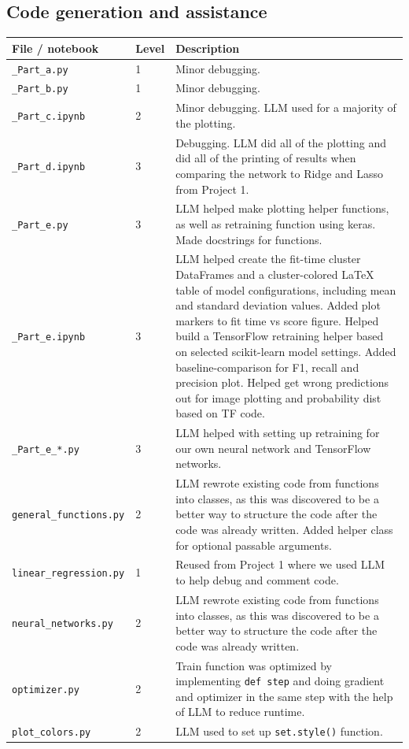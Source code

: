 \documentclass[reprint,english,notitlepage, floatfix]{revtex4-2}  %
\begin{document}
\subsection{Code generation and assistance}
\noindent
\begin{tabularx}{\linewidth}{l l X}
File / notebook & Level & Description\\ \hline
\texttt{\_Part\_a.py} & 1 & Minor debugging. \\
\texttt{\_Part\_b.py} & 1 & Minor debugging. \\
\texttt{\_Part\_c.ipynb} & 2 & Minor debugging. LLM used for a majority of the plotting. \\
\texttt{\_Part\_d.ipynb} & 3 & Debugging. LLM did all of the plotting and did all of the printing of results when comparing the network to Ridge and Lasso from Project 1. \\
\texttt{\_Part\_e.py} & 3 & LLM helped make plotting helper functions, as well as retraining function using keras. Made docstrings for functions.\\
\texttt{\_Part\_e.ipynb} & 3 & LLM helped create the fit-time cluster DataFrames and a cluster-colored LaTeX table of model configurations, including mean and standard deviation values. Added plot markers to fit time vs score figure. Helped build a TensorFlow retraining helper based on selected scikit-learn model settings. Added baseline-comparison for F1, recall and precision plot. Helped get wrong predictions out for image plotting and probability dist based on TF code. \\
\texttt{\_Part\_e\_*.py} & 3 & LLM helped with setting up retraining for our own neural network and TensorFlow networks. \\ 
\texttt{general\_functions.py} & 2 & LLM rewrote existing code from functions into classes, as this was discovered to be a better way to structure the code after the code was already written. Added helper class for optional passable arguments. \\
\texttt{linear\_regression.py} & 1 & Reused from Project 1 where we used LLM to help debug and comment code. \\
\texttt{neural\_networks.py} & 2 & LLM rewrote existing code from functions into classes, as this was discovered to be a better way to structure the code after the code was already written. \\
\texttt{optimizer.py} & 2 & Train function was optimized by implementing \texttt{def step} and doing gradient and optimizer in the same step with the help of LLM to reduce runtime. \\
\texttt{plot\_colors.py} & 2 & LLM used to set up \texttt{set.style()} function. \\
\end{tabularx}
\end{document}
